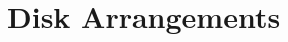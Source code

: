\documentclass[10pt]{CSUNthesis}
\theoremstyle{plain}%
\theoremstyle{definition}
\theoremstyle{remark}
\begin{document}








\section{Disk Arrangements\label{sec:disk}}
\end{document}
